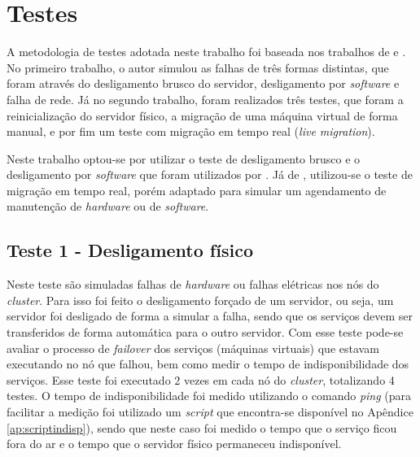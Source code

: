 \section{Testes}

A metodologia de testes adotada neste trabalho foi baseada nos trabalhos de \citet{reis2009} e \citet{goncalves2009}. No primeiro trabalho, 
o autor simulou as falhas de três formas distintas, que foram através do desligamento brusco do servidor, desligamento por \textit{software} e 
falha de rede. Já no segundo trabalho, foram realizados três testes, que foram a reinicialização do servidor físico, a migração de uma 
máquina virtual de forma manual, e por fim um teste com migração em tempo real (\textit{live migration}).

Neste trabalho optou-se por utilizar o teste de desligamento brusco e o desligamento por \textit{software} que foram utilizados por 
\citet{reis2009}. Já de \citet{goncalves2009}, utilizou-se o teste de migração em tempo real, porém adaptado para simular um agendamento de 
manutenção de \textit{hardware} ou de \textit{software}.


\subsection{Teste 1 - Desligamento físico}

Neste teste são simuladas falhas de \textit{hardware} ou falhas elétricas nos nós do \textit{cluster}. Para isso foi feito o desligamento 
forçado de um servidor, ou seja, um servidor foi desligado de forma a simular a falha, sendo que os serviços devem ser transferidos de forma
automática para o outro servidor. Com esse teste pode-se avaliar o processo de \textit{failover} dos serviços (máquinas virtuais) que estavam 
executando no nó que falhou, bem como medir o tempo de indisponibilidade dos serviços. Esse teste foi executado 2 vezes em cada nó do 
\textit{cluster}, totalizando 4 testes. O tempo de indisponibilidade foi medido utilizando o comando \textit{ping} (para facilitar a medição foi 
utilizado um \textit{script} que encontra-se disponível no Apêndice \ref{ap:scriptindisp}), sendo que neste caso foi medido o tempo que o 
serviço ficou fora do ar e o tempo que o servidor físico permaneceu indisponível.


